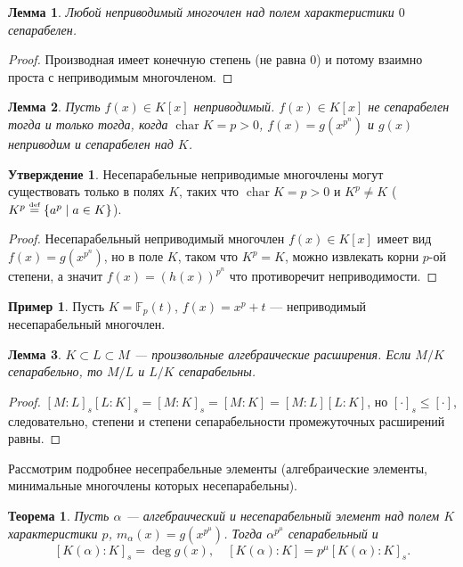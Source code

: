 \documentclass[12pt]{article}%
\renewcommand{\leq}{\leqslant}
\newcommand{\F}{\ensuremath{\mathbb F}}
\renewcommand{\leq}{\leqslant}
\DeclareMathOperator{\chr}{char}
\newcommand{\eqdef}{\stackrel{\text{\upshape\tiny def}}{=}}
\newtheorem{Thm}{Теорема}[section]
\newtheorem{Lemma}{Лемма}[section]
\theoremstyle{remark}
\theoremstyle{definition}
\newtheorem{Ex}{Пример}
\newtheorem{Prop}{Утверждение}
\begin{document}
\begin{Lemma}
Любой неприводимый многочлен над полем характеристики $0$ сепарабелен.
\end{Lemma}
\begin{proof}Производная имеет конечную степень (не равна $0$) и потому взаимно
проста с неприводимым многочленом.
\end{proof}

\begin{Lemma}
Пусть $f(x) \in K[x]$ неприводимый. $f(x) \in K[x]$ не сепарабелен тогда и
только тогда, когда $\chr K = p > 0$, $f(x) = g(x^{p^n})$ и $g(x)$ неприводим и сепарабелен над $K$.
\end{Lemma}

\begin{Prop}
Несепарабельные неприводимые многочлены могут существовать только в полях $K$,
таких что $\chr K = p > 0$ и $K^p \neq K$ ($K^p \eqdef \{a^p \mid a \in K\}$).
\end{Prop}
\begin{proof}
Несепарабельный неприводимый многочлен $f(x) \in K[x]$ имеет вид $f(x) =
g(x^{p^n})$, но в поле $K$, таком что $K^p = K$, можно извлекать корни $p$-ой степени, а значит
$f(x) = \left ( h(x) \right )^{p^n}$ что противоречит неприводимости.
\end{proof}

\begin{Ex}
Пусть $K=\F_p(t)$, $f(x) = x^p + t$ — неприводимый несепарабельный многочлен.
\end{Ex}

\begin{Lemma}
$K \subset L \subset M$ — произвольные алгебраические расширения. Если $M/K$
сепарабельно, то $M/L$ и $L/K$ сепарабельны.
\end{Lemma}

\begin{proof}
$[M:L]_s[L:K]_s = [M:K]_s = [M:K] = [M:L][L:K]$, но $[\cdot]_s\leq[\cdot]$,
следовательно, степени и степени сепарабельности промежуточных расширений равны.
\end{proof}

Рассмотрим подробнее несепрабельные элементы (алгебраические элементы,
минимальные многочлены которых несепарабельны).

\begin{Thm}
Пусть $\alpha$ — алгебраический и несепарабельный элемент над полем $K$
характеристики $p$, $m_\alpha(x) = g(x^{p^\mu})$. Тогда $\alpha^{p^\mu}$ сепарабельный и
\[
    [K(\alpha):K]_s = \deg g(x), \quad [K(\alpha):K] = p^\mu [K(\alpha):K]_s.
\]
\end{Thm}
\end{document}
